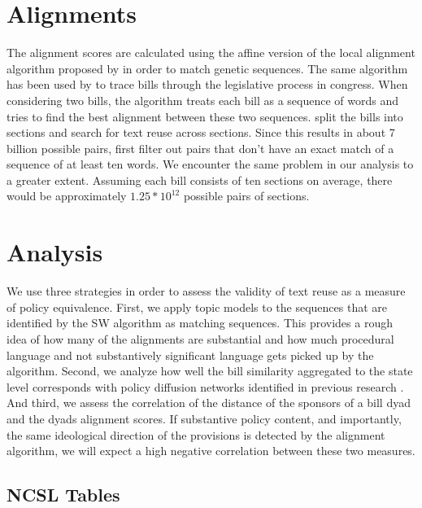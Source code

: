 \documentclass[12pt]{article} %
\begin{document}
\section{Alignments}

The alignment scores are calculated using the affine version of the local alignment algorithm proposed by \citet{smith1981identification} in order to match genetic sequences. The same algorithm has been used by \citet{wilkerson2015tracing} to trace bills through the legislative process in congress. When considering two bills, the algorithm treats each bill as a sequence of words and tries to find the best alignment between these two sequences. \citet{wilkerson2015tracing} split the bills into sections and search for text reuse across sections. Since this results in about 7 billion possible pairs, first filter out pairs that don't have an exact match of a sequence of at least ten words. We encounter the same problem in our analysis to a greater extent. Assuming each bill consists of ten sections on average, there would be approximately $1.25 * 10^{12}$ possible pairs of sections. 



\section{Analysis}

We use three strategies in order to assess the validity of text reuse as a measure of policy equivalence. First, we apply topic models to the sequences that are identified by the SW algorithm as matching sequences. This provides a rough idea of how many of the alignments are substantial and how much procedural language and not substantively significant language gets picked up by the algorithm. Second, we analyze how well the bill similarity aggregated to the state level corresponds with policy diffusion networks identified in previous research \citep{desmarais2015}. And third, we assess the correlation of the distance of the sponsors of a bill dyad and the dyads alignment scores. If substantive policy content, and importantly, the same ideological direction of the provisions is detected by the alignment algorithm, we will expect a high negative correlation between these two measures.
\subsection{NCSL Tables}



\end{document}
